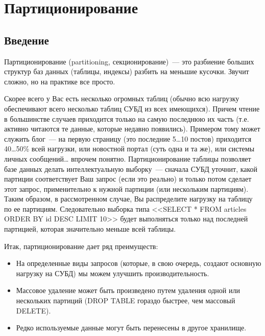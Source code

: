 \chapter{Партиционирование}
\begin{epigraphs}
\end{epigraphs}
\section{Введение}
Партиционирование (partitioning, секционирование)~--- это разбиение больших структур баз данных (таблицы, индексы) разбить на меньшие кусочки. 
Звучит сложно, но на практике все просто.

Скорее всего у Вас есть несколько огромных таблиц (обычно всю нагрузку обеспечивают всего несколько таблиц СУБД из всех имеющихся). 
Причем чтение в большинстве случаев приходится только на самую последнюю их часть (т.е. активно читаются те данные, которые 
недавно появились). Примером тому может служить блог~--- на первую страницу (это последние 5\dots10 постов) приходится 40\dots50\% 
всей нагрузки, или новостной портал (суть одна и та же), или системы личных сообщений… впрочем понятно. Партиционирование 
таблицы позволяет базе данных делать интеллектуальную выборку~--- сначала СУБД уточнит, какой партиции соответствует Ваш запрос 
(если это реально) и только потом сделает этот запрос, применительно к нужной партиции (или нескольким партициям). Таким образом, 
в рассмотренном случае, Вы распределите нагрузку на таблицу по ее партициям. Следовательно выборка типа 
<<SELECT * FROM articles ORDER BY id DESC LIMIT 10>> будет выполняться только над последней партицией, которая значительно 
меньше всей таблицы.

Итак, партиционирование дает ряд преимуществ:
\begin{itemize}
\item На определенные виды запросов (которые, в свою очередь, создают основную нагрузку на СУБД) мы можем улучшить производительность.
\item Массовое удаление может быть произведено путем удаления одной или нескольких партиций 
(DROP TABLE гораздо быстрее, чем массовый DELETE).
\item Редко используемые данные могут быть перенесены в другое хранилище.
\end{itemize}

